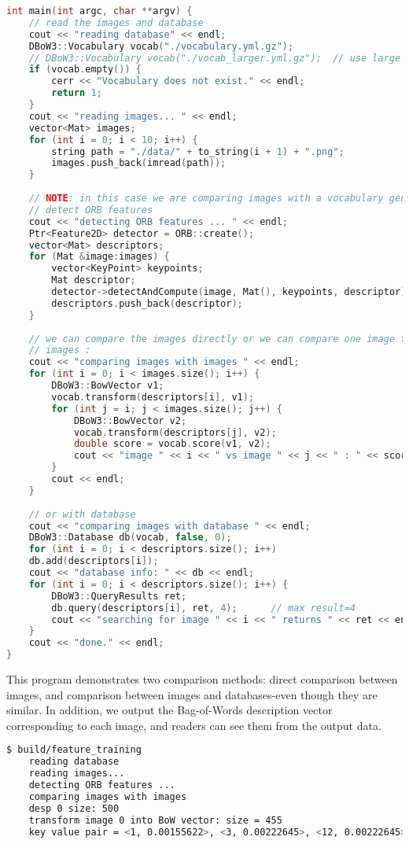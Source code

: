 \begin{lstlisting}[language=c++,caption=slambook/ch12/loop\_closure.cpp]
int main(int argc, char **argv) {
	// read the images and database  
	cout << "reading database" << endl;
	DBoW3::Vocabulary vocab("./vocabulary.yml.gz");
	// DBoW3::Vocabulary vocab("./vocab_larger.yml.gz");  // use large vocab if you want: 
	if (vocab.empty()) {
		cerr << "Vocabulary does not exist." << endl;
		return 1;
	}
	cout << "reading images... " << endl;
	vector<Mat> images;
	for (int i = 0; i < 10; i++) {
		string path = "./data/" + to_string(i + 1) + ".png";
		images.push_back(imread(path));
	}
	
	// NOTE: in this case we are comparing images with a vocabulary generated by themselves, this may lead to overfit.
	// detect ORB features
	cout << "detecting ORB features ... " << endl;
	Ptr<Feature2D> detector = ORB::create();
	vector<Mat> descriptors;
	for (Mat &image:images) {
		vector<KeyPoint> keypoints;
		Mat descriptor;
		detector->detectAndCompute(image, Mat(), keypoints, descriptor);
		descriptors.push_back(descriptor);
	}
	
	// we can compare the images directly or we can compare one image to a database 
	// images :
	cout << "comparing images with images " << endl;
	for (int i = 0; i < images.size(); i++) {
		DBoW3::BowVector v1;
		vocab.transform(descriptors[i], v1);
		for (int j = i; j < images.size(); j++) {
			DBoW3::BowVector v2;
			vocab.transform(descriptors[j], v2);
			double score = vocab.score(v1, v2);
			cout << "image " << i << " vs image " << j << " : " << score << endl;
		}
		cout << endl;
	}
	
	// or with database 
	cout << "comparing images with database " << endl;
	DBoW3::Database db(vocab, false, 0);
	for (int i = 0; i < descriptors.size(); i++)
	db.add(descriptors[i]);
	cout << "database info: " << db << endl;
	for (int i = 0; i < descriptors.size(); i++) {
		DBoW3::QueryResults ret;
		db.query(descriptors[i], ret, 4);      // max result=4
		cout << "searching for image " << i << " returns " << ret << endl << endl;
	}
	cout << "done." << endl;
}
\end{lstlisting}

This program demonstrates two comparison methods: direct comparison between images, and comparison between images and databases-even though they are similar. In addition, we output the Bag-of-Words description vector corresponding to each image, and readers can see them from the output data.

\begin{lstlisting}[language=sh,caption=Terminal output:]
	$ build/feature_training
	reading database
	reading images... 
	detecting ORB features ... 
	comparing images with images 
	desp 0 size: 500
	transform image 0 into BoW vector: size = 455
	key value pair = <1, 0.00155622>, <3, 0.00222645>, <12, 0.00222645>, <13, 0.00222645>, <14, 0.00222645>, <22, 0.00222645>, <33, 0.00222645>, <37, 0.00155622>, <38, 0.00222645>, <39, 0.00222645>, <43, 0.00222645>, <57, 0.00155622> ......
\end{lstlisting}

